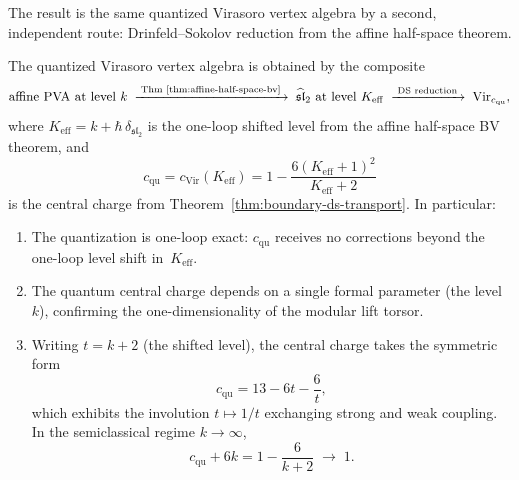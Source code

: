 The result is the same quantized Virasoro vertex algebra by a second,
independent route: Drinfeld--Sokolov reduction from the affine half-space
theorem.

\begin{theorem}
\label{thm:virasoro-quantization-ds}
The quantized Virasoro vertex algebra is obtained by the composite
\[
\text{affine PVA at level }k
\;\xrightarrow{\;\text{Thm~\ref{thm:affine-half-space-bv}}\;}
\;\widehat{\mathfrak{sl}}_2\text{ at level }K_{\mathrm{eff}}
\;\xrightarrow{\;\text{DS reduction}\;}
\;\mathrm{Vir}_{c_{\mathrm{qu}}},
\]
where $K_{\mathrm{eff}} = k + \hbar\,\delta_{\mathfrak{sl}_2}$ is the
one-loop shifted level from the affine half-space BV theorem, and
\begin{equation}\label{eq:virasoro-central-charge-ds}
c_{\mathrm{qu}} = c_{\mathrm{Vir}}(K_{\mathrm{eff}})
= 1 - \frac{6(K_{\mathrm{eff}}+1)^2}{K_{\mathrm{eff}}+2}
\end{equation}
is the central charge from
Theorem~\textup{\ref{thm:boundary-ds-transport}}.
In particular:
\begin{enumerate}[leftmargin=2.4em]
\item The quantization is one-loop exact: $c_{\mathrm{qu}}$ receives
no corrections beyond the one-loop level shift in~$K_{\mathrm{eff}}$.
\item The quantum central charge depends on a single formal parameter
(the level~$k$), confirming the one-dimensionality of the modular lift
torsor.
\item Writing $t = k+2$ (the shifted level), the central charge
takes the symmetric form
\[
c_{\mathrm{qu}} = 13 - 6t - \frac{6}{t},
\]
which exhibits the involution $t\mapsto 1/t$ exchanging strong and
weak coupling. In the semiclassical regime $k\to\infty$,
\[
c_{\mathrm{qu}} + 6k = 1 - \frac{6}{k+2} \;\to\; 1.
\]
\end{enumerate}
\end{theorem}

